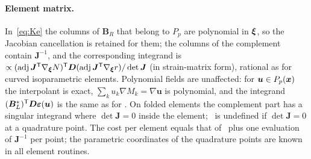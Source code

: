 \paragraph{Element matrix.} In~\eqref{eq:Ke} the columns of $\bm B_R$ that belong to $P_p$
are polynomial in $\bm{\xi}$, so the Jacobian cancellation is retained for them; the columns of the
complement contain $\bm J^{-1}$, and the corresponding integrand is
$\propto(\operatorname{adj}\bm J^{\mathsf{T}}\nabla_{\bm{\xi}}N)^{\mathsf{T}}\bm D(\operatorname{adj}\bm
J^{\mathsf{T}}\nabla_{\bm{\xi}}r)/\det\bm J$ (in strain-matrix form), rational as for curved isoparametric elements. Polynomial fields are
unaffected: for $\bm u\in P_p(\bm{x})$ the interpolant is exact, $\sum_ku_k\nabla M_k=\nabla\bm u$
is polynomial, and the integrand $(\bm B_L^\ast)^{\mathsf{T}}\bm D\bm\varepsilon(\bm u)$ is the same as for
\PM. On folded elements the complement part has a singular integrand where $\det\bm J=0$ inside
the element; \PH\ is undefined if $\det\bm J=0$ at a quadrature point. The cost per element
equals that of \PM\ plus one evaluation of $\bm J^{-1}$ per point; the parametric coordinates of
the quadrature points are known in all element routines.

